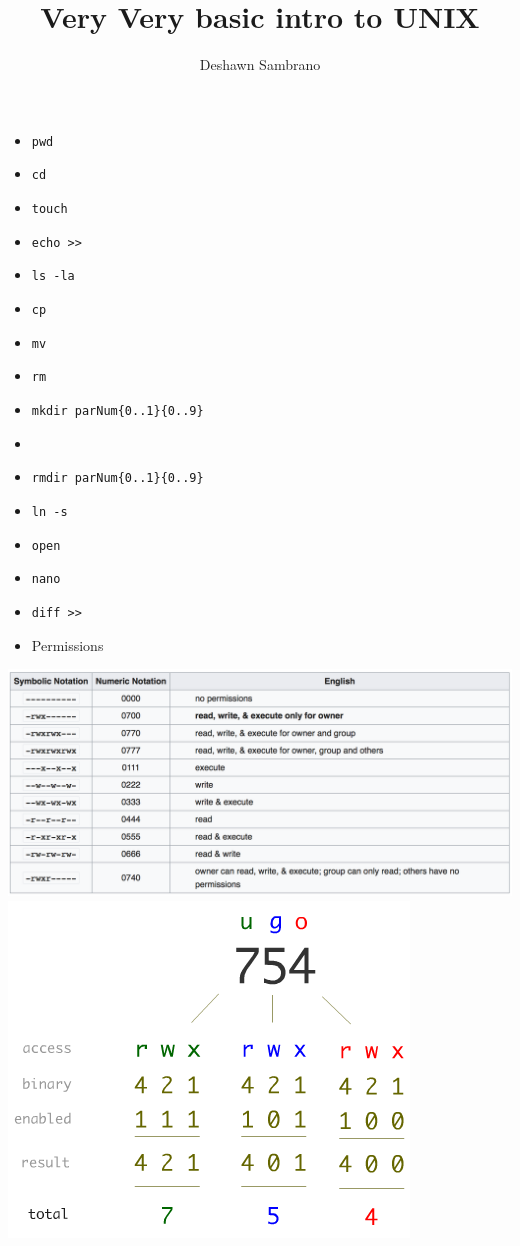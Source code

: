 \documentclass{article}
\title{Very Very basic intro to UNIX}
\author{Deshawn Sambrano}
\begin{document}
\maketitle

\begin{itemize}
	\item \texttt{pwd}
	\item \texttt{cd}
	\item \texttt{touch}
	\item \texttt{echo >>}
	\item \texttt{ls -la}
	\item \texttt{cp}
	\item \texttt{mv}
	\item \texttt{rm}
	\item \texttt{mkdir parNum\{0..1\}\{0..9\}}
	\item {}
	\item \texttt{rmdir parNum\{0..1\}\{0..9\}}
	\item \texttt{ln -s}
	\item \texttt{open}
	\item \texttt{nano}
	\item \texttt{diff >>}
	\item Permissions
\end{itemize}
	  \includegraphics[width=\linewidth]{Permission1}
	  \includegraphics[width=\linewidth]{Permissions2}
	  
\end{document}
